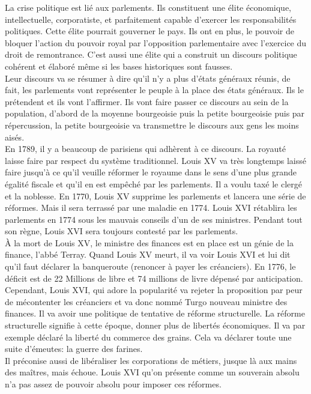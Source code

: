\documentclass[10pt, a4paper, openany]{book}
\begin{document}
La crise politique est lié aux parlements. Ils constituent une élite économique, intellectuelle, corporatiste, et parfaitement capable d'exercer les responsabilités politiques. Cette élite pourrait gouverner le pays. Ils ont en plus, le pouvoir de bloquer l'action du pouvoir royal par l'opposition parlementaire avec l'exercice du droit de remontrance. C'est aussi une élite qui a construit un discours politique cohérent et élaboré même si les bases historiques sont fausses. \\
Leur discours va se résumer à dire qu'il n'y a plus d'états généraux réunis, de fait, les parlements vont représenter le peuple à la place des états généraux. Ils le prétendent et ils vont l'affirmer. Ils vont faire passer ce discours au sein de la population, d'abord de la moyenne bourgeoisie puis la petite bourgeoisie puis par répercussion, la petite bourgeoisie va transmettre le discours aux gens les moins aisés. \\
En 1789, il y a beaucoup de parisiens qui adhèrent à ce discours. La royauté laisse faire par respect du système traditionnel. Louis XV va très longtemps laissé faire jusqu'à ce qu'il veuille réformer le royaume dans le sens d'une plus grande égalité fiscale et qu'il en est empêché par les parlements. Il a voulu taxé le clergé et la noblesse. En 1770, Louis XV supprime les parlements et lancera une série de réformes. Mais il sera terrassé par une maladie en 1774. Louis XVI rétablira les parlements en 1774 sous les mauvais conseils d'un de ses ministres. Pendant tout son règne, Louis XVI sera toujours contesté par les parlements. \\
À la mort de Louis XV, le ministre des finances est en place est un génie de la finance, l'abbé Terray. Quand Louis XV meurt, il va voir Louis XVI et lui dit qu'il faut déclarer la banqueroute (renoncer à payer les créanciers). En 1776, le déficit est de 22 Millions de libre et 74 millions de livre dépensé par anticipation. Cependant, Louis XVI, qui adore la popularité va rejeter la proposition par peur de mécontenter les créanciers et va donc nommé Turgo nouveau ministre des finances. Il va avoir une politique de tentative de réforme structurelle. La réforme structurelle signifie à cette époque, donner plus de libertés économiques. Il va par exemple déclaré la liberté du commerce des grains. Cela va déclarer toute une suite d'émeutes: la guerre des farines. \\
Il préconise aussi de libéraliser les corporations de métiers, jusque là aux mains des maîtres, mais échoue. Louis XVI qu'on présente comme un souverain absolu n'a pas assez de pouvoir absolu pour imposer ces réformes. \\
\end{document}
